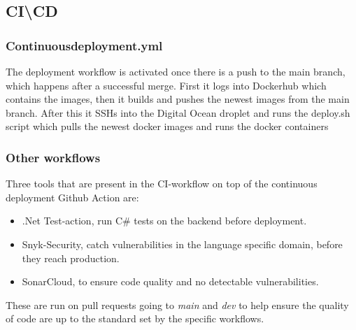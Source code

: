 \subsection{CI\textbackslash{}CD}

\subsubsection{Continuousdeployment.yml}
The deployment workflow is activated once there is a push to the main branch, which happens after a successful merge. First it logs into Dockerhub which contains the images, then it builds and pushes the newest images from the main branch. After this it SSHs into the Digital Ocean droplet and runs the deploy.sh script which pulls the newest docker images and runs the docker containers


\subsubsection{Other workflows}
Three tools that are present in the CI-workflow on top of the continuous deployment Github Action are:
\begin{itemize}
    \item .Net Test-action, run C\# tests on the backend before deployment.
    \item Snyk-Security, catch vulnerabilities in the language specific domain, before they reach production.
    \item SonarCloud, to ensure code quality and no detectable vulnerabilities.
\end{itemize}

These are run on pull requests going to \textit{main} and \textit{dev} to help ensure the quality of code are up to the standard set by the specific workflows.